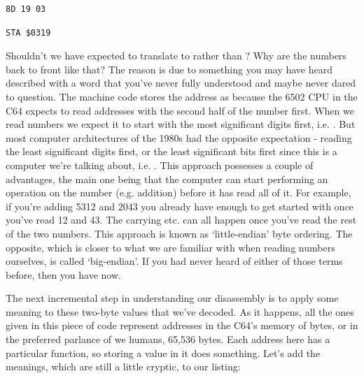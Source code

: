 \begin{minipage}[b]{0.45\linewidth}
\centering
\begin{lstlisting}[escapechar=\%]
8D 19 03
\end{lstlisting}
\end{minipage}
\hspace{0.5cm}
\begin{minipage}[b]{0.45\linewidth}
\centering
\begin{lstlisting}[escapechar=\%]
STA $0319
\end{lstlisting}
\end{minipage}

Shouldn't we have expected  to translate to  rather than 
? Why are the numbers back to front like that? The reason is due to something
you may have heard described with a word that you've never fully understood and maybe never
dared to question. The machine code
stores the address  as  because the 6502 CPU in the C64 expects to read
addresses with the second half of the number first. When we read numbers we expect it to start
with the most significant digits first, i.e. . But most computer architectures of the 1980s had the opposite
expectation - reading the least significant digits first, or the least significant bits first since
this is a computer we're talking about, i.e. . This approach possesses a couple of advantages,
the main one being that the computer can start performing an operation on the number (e.g. addition) before it
has read all of it. For example, if you're adding 5312 and 2043 you already have enough to get started with once
you've read 12 and 43. The carrying etc. can all happen once you've read the rest of the two numbers. This approach
is known as `little-endian' byte ordering. The opposite, which is closer to what we are familiar with when
reading numbers ourselves, is called `big-endian'. If you had never heard of either of those terms before, then
you have now.

The next incremental step in understanding our disassembly is to apply some meaning to these two-byte values
that we've decoded. As it happens, all the ones given in this piece of code represent addresses in the C64's
memory of  bytes, or in the preferred parlance of we humans, 65,536 bytes. Each address here
has a particular function, so storing a value in it does something. Let's add the meanings, which are still
a little cryptic, to our listing:

